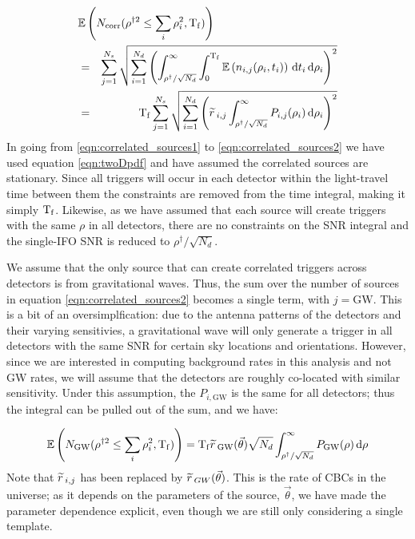 \begin{eqnarray}
\label{eqn:correlated_sources1}
\lefteqn{\mathbb{E}\left(N_{\mathrm{corr}} ( \rho^{\dagger2} \leq \sum_i\rho_i^2, \Tf ) \right) } \nonumber \\
 & = & \sum_{j=1}^{N_s} \sqrt{ \sum_{i=1}^{N_d} \left( \int_{\rho^{\dagger}/\sqrt{N_d}}^\infty \int_{0}^{\Tf} \mathbb{E}\left(n_{i,j}(\rho_i,t_i)\right)\d t_i \d \rho_i \right)^2 } \\
\label{eqn:correlated_sources2}
 & = & \Tf \sum_{j=1}^{N_s} \sqrt{ \sum_{i=1}^{N_d} \left( \rsrc_{i,j} \int_{\rho^\dagger/\sqrt{N_d}}^\infty P_{i,j}(\rho_i) \d \rho_i \right)^2 }
\end{eqnarray}
In going from \ref{eqn:correlated_sources1} to \ref{eqn:correlated_sources2} we have used equation \ref{eqn:twoDpdf} and have assumed the correlated sources are stationary. Since all triggers will occur in each detector within the light-travel time between them the constraints are removed from the time integral, making it simply $\mathrm{T_f}$. Likewise, as we have assumed that each source will create triggers with the same $\rho$ in all detectors, there are no constraints on the \ac{SNR} integral and the single-\ac{IFO} \ac{SNR} is reduced to $\rho^\dagger/\sqrt{N_d}$.

We assume that the only source that can create correlated triggers across detectors is from gravitational waves. Thus, the sum over the number of sources in equation \ref{eqn:correlated_sources2} becomes a single term, with $j = \mathrm{GW}$. This is a bit of an oversimplfication: due to the antenna patterns of the detectors and their varying sensitivies, a gravitational wave will only generate a trigger in all detectors with the same \ac{SNR} for certain sky locations and orientations. However, since we are interested in computing background rates in this analysis and not \ac{GW} rates, we will assume that the detectors are roughly co-located with similar sensitivity. Under this assumption, the $P_{i,\mathrm{GW}}$ is the same for all detectors; thus the integral can be pulled out of the sum, and we have:

\begin{equation}
\label{eqn:correlated_GW_colocated}
\mathbb{E}\left(N_{\mathrm{GW}} (\rho^{\dagger2} \leq  \sum_i\rho_i^2, \mathrm{T_f} ) \right) = \mathrm{T_f} \widetilde{r}\,_{\mathrm{GW}}(\vec{\theta}) \sqrt{N_d} \int_{\rho^\dagger/\sqrt{N_d}}^{\infty} P_{\mathrm{GW}}(\rho) \,\mathrm{d} \rho
\end{equation}
Note that $\widetilde{r}\,_{i,j}$ has been replaced by $\widetilde{r}\,_{GW}(\vec{\theta})$. This is the rate of \acp{CBC} in the universe; as it depends on the parameters of the source, $\vec{\theta}$, we have made the parameter dependence explicit, even though we are still only considering a single template.

